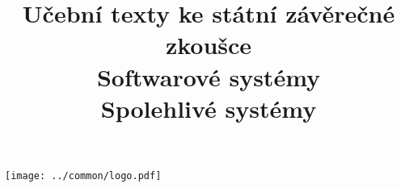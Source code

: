 \clearpage

\clearpage

\title{\LARGE Učební texty ke státní závěrečné zkoušce \\ Softwarové systémy \\ Spolehlivé systémy}




\maketitle

\vspace{10mm}
\begin{center}
\texttt{[image: ../common/logo.pdf]}
\end{center} 

\clearpage

\clearpage

\tableofcontents







